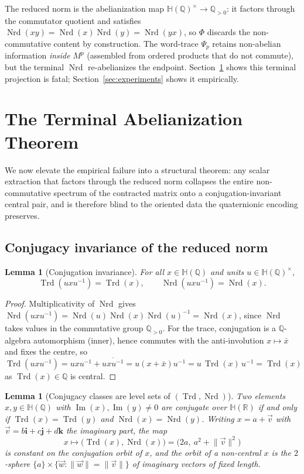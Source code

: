 \documentclass[pdflatex,sn-mathphys-num]{sn-jnl}
\theoremstyle{thmstyleone}%
\newtheorem{lemma}[theorem]{Lemma}%
\theoremstyle{thmstyletwo}%
\theoremstyle{thmstylethree}%
\newcommand{\HH}{\mathbb{H}}
\newcommand{\QQ}{\mathbb{Q}}
\newcommand{\RR}{\mathbb{R}}
\newcommand{\Nrd}{\operatorname{Nrd}}
\newcommand{\Trd}{\operatorname{Trd}}
\newcommand{\bi}{\mathbf{i}}
\newcommand{\bj}{\mathbf{j}}
\newcommand{\bk}{\mathbf{k}}
\DeclareMathOperator{\im}{Im}
\begin{document}
The reduced norm is the abelianization map
$\HH(\QQ)^{\times}\to\QQ_{>0}$: it factors through the commutator quotient
and satisfies $\Nrd(xy)=\Nrd(x)\Nrd(y)=\Nrd(yx)$, so $\Phi$ discards the
non-commutative content by construction. The word-trace $\Psi_p$ retains
non-abelian information \emph{inside} $M^p$ (assembled from ordered products
that do not commute), but the terminal $\Nrd$ re-abelianizes the endpoint.
Section~\ref{sec:terminal} shows this terminal projection is fatal;
Section~\ref{sec:experiments} shows it empirically.

\newpage

\section{The Terminal Abelianization Theorem}\label{sec:terminal}

We now elevate the empirical failure into a structural theorem: any scalar
extraction that factors through the reduced norm collapses the entire
non-commutative spectrum of the contracted matrix onto a
conjugation-invariant central pair, and is therefore blind to the oriented
data the quaternionic encoding preserves.

\subsection{Conjugacy invariance of the reduced norm}

\begin{lemma}[Conjugation invariance]\label{lem:conjinv}
For all $x\in\HH(\QQ)$ and units $u\in\HH(\QQ)^{\times}$,
\[
  \Trd(uxu^{-1})=\Trd(x),\qquad \Nrd(uxu^{-1})=\Nrd(x).
\]
\end{lemma}

\begin{proof}
Multiplicativity of $\Nrd$ gives
$\Nrd(uxu^{-1})=\Nrd(u)\Nrd(x)\Nrd(u)^{-1}=\Nrd(x)$, since $\Nrd$ takes
values in the commutative group $\QQ_{>0}$. For the trace, conjugation is a
$\QQ$-algebra automorphism (inner), hence commutes with the anti-involution
$x\mapsto\bar x$ and fixes the centre, so
$\Trd(uxu^{-1})=uxu^{-1}+\overline{uxu^{-1}}
=u(x+\bar x)u^{-1}=u\,\Trd(x)\,u^{-1}=\Trd(x)$ as $\Trd(x)\in\QQ$ is
central.
\end{proof}

\begin{lemma}[Conjugacy classes are level sets of $(\Trd,\Nrd)$]
\label{lem:levelsets}
Two elements $x,y\in\HH(\QQ)$ with $\im(x),\im(y)\neq0$ are conjugate over
$\HH(\RR)$ if and only if $\Trd(x)=\Trd(y)$ and $\Nrd(x)=\Nrd(y)$. Writing
$x=a+\vec v$ with $\vec v=b\bi+c\bj+d\bk$ the imaginary part, the map
\[
  x\longmapsto\big(\Trd(x),\Nrd(x)\big)=\big(2a,\ a^2+\lVert\vec v\rVert^2\big)
\]
is constant on the conjugation orbit of $x$, and the orbit of a
non-central $x$ is the $2$-sphere $\{a\}\times\{\vec w:\lVert\vec
w\rVert=\lVert\vec v\rVert\}$ of imaginary vectors of fixed length.
\end{lemma}
\end{document}
